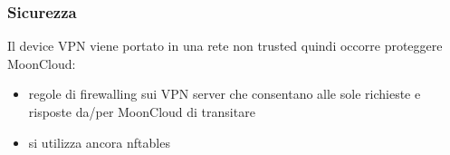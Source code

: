 \begin{frame}
    \frametitle{Sicurezza}
    Il device VPN viene portato in una rete \alert{non trusted} quindi
    occorre \alert{proteggere MoonCloud}:
    \begin{itemize}
        \item \alert{regole di firewalling} sui VPN server che consentano
        alle \alert{sole richieste e risposte} da/per MoonCloud di transitare
    \end{itemize}

    \begin{itemize}
        \item si utilizza ancora \alert{nftables}
    \end{itemize}
\end{frame}


